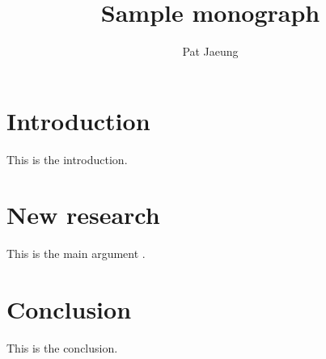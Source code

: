 \documentclass{langscibook}
\author{Pat Jaeung}
\title{Sample monograph}
\subtitle{}
\begin{document}
\maketitle
\frontmatter
{} %
\tableofcontents
\mainmatter
\chapter{Introduction}
This is the introduction.
\chapter{New research}
This is the main argument \citep{Chomsky1957}.
\chapter{Conclusion}
This is the conclusion.

\backmatter
\sloppy
{}%
\printbibliography[heading=references]
\cleardoublepage

{}
\ohead{\lsNameIndexTitle}
\printindex
\cleardoublepage

{}
\ohead{\lsLanguageIndexTitle}
\printindex[lan]
\cleardoublepage

{}
\ohead{\lsSubjectIndexTitle}
\printindex[sbj]
\ohead{}
\end{document}
